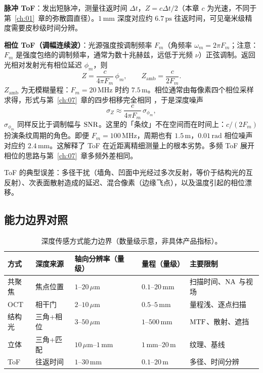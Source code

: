 \textbf{脉冲 ToF}：发出短脉冲，测量往返时间 $\Delta t$，$Z=c\Delta t/2$（本章 $c$ 为光速，不同于第~\ref{ch:01}~章的弥散圆直径）。$1\,\mathrm{mm}$ 深度对应约 $6.7\,\mathrm{ps}$ 往返时间，可见毫米级精度需要皮秒级时间分辨。

\textbf{相位 ToF（调幅连续波）}：光源强度按调制频率 $F_m$（角频率 $\omega_m=2\pi F_m$；注意：$F_m$ 是强度包络的调制频率，通常为数十兆赫兹，远低于光频 $\nu$）正弦调制。返回光相对发射光有相位延迟 $\phi_m$，则
\begin{equation}
  Z=\frac{c}{4\pi F_m}\,\phi_m,\qquad Z_{\mathrm{amb}}=\frac{c}{2F_m}.
  \label{eq:ch10-tof}
\end{equation}
$Z_{\mathrm{amb}}$ 为无模糊量程：$F_m=20\,\mathrm{MHz}$ 时约 $7.5\,\mathrm{m}$。相位通常由每像素四个相位采样求得，形式与第~\ref{ch:07}~章的四步相移完全相同 \citep{LangeSeitz2001ToF}，于是深度噪声
\[
  \sigma_Z\approx\frac{c}{4\pi F_m}\,\sigma_{\phi_m},
\]
$\sigma_{\phi_m}$ 同样反比于调制幅与 $\mathrm{SNR}$。这里的「条纹」不在空间而在时间上：$c/(2F_m)$ 扮演条纹周期的角色。即便 $F_m=100\,\mathrm{MHz}$，周期也有 $1.5\,\mathrm{m}$，$0.01\,\mathrm{rad}$ 相位噪声对应约 $2.4\,\mathrm{mm}$。这解释了 ToF 在近距离精细测量上的根本劣势。多频 ToF 展开相位的思路与第~\ref{ch:07}~章多频外差相同。

ToF 的典型误差：多径干扰（墙角、凹面中光经过多次反射，等价于结构光的互反射）、次表面散射造成的延迟、混合像素（边缘飞点），以及温度引起的相位漂移。

\subsection{能力边界对照}

\begin{table}[htbp]
  \centering
  \small
  \begin{tabular}{@{}p{}p{}p{}p{}p{}@{}}
    \toprule
    方式 & 深度来源 & 轴向分辨率（量级） & 量程（量级） & 主要限制 \\
    \midrule
    共聚焦 & 焦点位置 & $1$--$20\,\mu\mathrm{m}$ & $0.1$--$20\,\mathrm{mm}$ & 扫描时间、$\mathrm{NA}$ 与视场 \\
    OCT & 相干门 & $2$--$10\,\mu\mathrm{m}$ & $0.5$--$5\,\mathrm{mm}$ & 量程浅、逐点扫描 \\
    结构光 & 三角+相位 & $3$--$50\,\mu\mathrm{m}$ & $1$--$500\,\mathrm{mm}$ & $\mathrm{MTF}$、散射、遮挡 \\
    立体 & 三角+匹配 & $10\,\mu\mathrm{m}$--$1\,\mathrm{mm}$ & $1\,\mathrm{mm}$--$20\,\mathrm{m}$ & 纹理、基线 \\
    ToF & 往返时间 & $1$--$30\,\mathrm{mm}$ & $0.1$--$20\,\mathrm{m}$ & 多径、时间分辨 \\
    \bottomrule
  \end{tabular}
  \caption{深度传感方式能力边界（数量级示意，非具体产品指标）。}
  \label{tab:ch09-compare}
\end{table}


